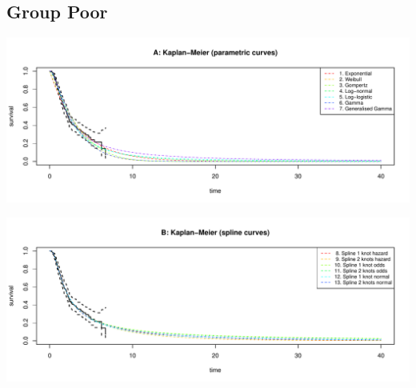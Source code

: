 \documentclass[]{article}
\begin{document}
\newpage

\subsection{Group Poor}\label{group-poor}

\begin{flushleft}\includegraphics[height=0.29\textheight]{images/validate_extrapolation3-1} \end{flushleft}

\begin{flushleft}\includegraphics[height=0.29\textheight]{images/validate_extrapolation3-2} \end{flushleft}
\end{document}
